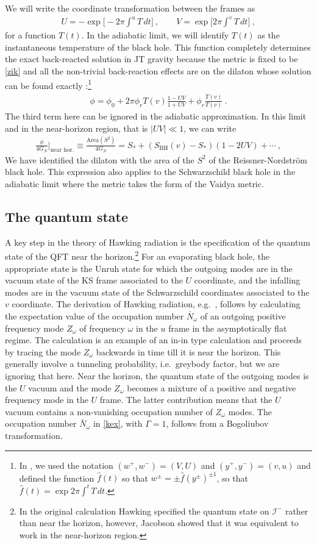 \documentclass[12pt]{article}
\newcommand\SBH{S_\text{BH}}
\newcommand{\EQ}[1]{\begin{equation}\begin{split} #1
\end{split}\end{equation}}
\begin{document}
We will write the coordinate transformation between the frames as 
\EQ{
U=-\exp\Big[-2\pi\int^u T\,dt\Big]\ ,\qquad V=\exp\Big[2\pi\int^v T\,dt\Big]\ ,
\label{pop}
}
for a function $T(t)$. In the adiabatic limit, we will identify $T(t)$ as the instantaneous temperature of the black hole. This function completely determines the exact back-reacted solution in JT  gravity because the metric is fixed to be \eqref{zik} and all the non-trivial back-reaction effects are on the dilaton whose solution can be found exactly \cite{Hollowood:2020cou}:\footnote{In \cite{Hollowood:2020cou}, we used the  notation $(w^+,w^-)=(V,U)$ and $(y^+,y^-)=(v,u)$ and  defined the function $\hat f(t)$ so that $w^\pm=\pm\hat f(y^\pm)^{\pm1}$, so that $\hat f(t)=\exp2\pi\int^t T\,dt$.}
\EQ{
\phi=\phi_0+2\pi\phi_r T(v)\frac{1-UV}{1+UV}+\phi_r\frac{\dot T(v)}{T(v)}\ .
\label{dil}
}
The third term here can be ignored in the adiabatic approximation. In this limit and in the near-horizon region, that is $|UV|\ll1$, we can write
\EQ{
\frac{\phi}{4G_N}\Big|_\text{near hor.}\equiv \frac{\text{Area}(S^2)}{4G_N}=S_*+(\SBH (v)-S_*)(1-2UV)+\cdots\ ,
\label{nil}
}
We have identified the dilaton with the area of the  $S^2$ of the  Reissner-Nordstr\"om black hole. This expression also applies to the Schwarzschild black hole in the adiabatic limit where the metric takes the form of the Vaidya metric.

\subsection{The quantum state}

A key step in the theory of Hawking radiation is the specification of the quantum state of the QFT near the horizon.\footnote{In the original calculation Hawking specified the quantum state on $\mathscr I^-$ rather than near the horizon, however, Jacobson \cite{Jacobson:2003vx}  showed that it was equivalent to work in the near-horizon region.}
For an evaporating black hole, the appropriate state is the Unruh state for which the outgoing modes are in the vacuum state of the KS frame associated to  the $U$ coordinate, and the infalling modes are in the vacuum state of the Schwarzschild coordinates associated to the $v$ coordinate. The derivation of Hawking radiation, e.g.~\cite{BD}, follows by calculating the expectation value of the occupation number $\bar N_\omega$ of an outgoing positive frequency mode $Z_\omega$ of frequency $\omega$ in the $u$ frame in the asymptotically flat regime. The calculation is an example of an in-in type calculation and proceeds by tracing  the mode $Z_\omega$ backwards in time till it is near the horizon. This generally involve a tunneling  probability, i.e.~greybody factor, but we are ignoring that here. Near the horizon, the quantum state of the outgoing modes is the $U$ vacuum and the mode $Z_\omega$ becomes a mixture of a positive and negative frequency mode in the $U$ frame. The latter contribution means that the $U$ vacuum contains a non-vanishing occupation number of $Z_\omega$ modes. The occupation number $\bar N_\omega$ in \eqref{kex}, with $\Gamma=1$, follows from a Bogoliubov transformation.
\end{document}
